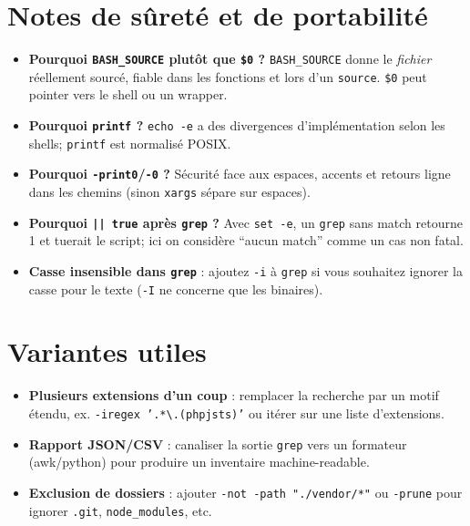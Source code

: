 \documentclass[11pt,a4paper]{article}
\begin{document}
\section{Notes de sûreté et de portabilité}
\begin{itemize}
  \item \textbf{Pourquoi \texttt{BASH\_SOURCE} plutôt que \texttt{\$0} ?} \texttt{BASH\_SOURCE} donne le \emph{fichier} réellement sourcé, fiable dans les fonctions et lors d'un \texttt{source}. \texttt{\$0} peut pointer vers le shell ou un wrapper.
  \item \textbf{Pourquoi \texttt{printf} ?} \texttt{echo -e} a des divergences d'implémentation selon les shells; \texttt{printf} est normalisé POSIX.
  \item \textbf{Pourquoi \texttt{-print0}/\texttt{-0} ?} Sécurité face aux espaces, accents et retours ligne dans les chemins (sinon \texttt{xargs} sépare sur espaces).
  \item \textbf{Pourquoi \texttt{|| true} après \texttt{grep} ?} Avec \texttt{set -e}, un \texttt{grep} sans match retourne 1 et tuerait le script; ici on considère ``aucun match'' comme un cas non fatal.
  \item \textbf{Casse insensible dans \texttt{grep}} : ajoutez \texttt{-i} à \texttt{grep} si vous souhaitez ignorer la casse pour le texte (\texttt{-I} ne concerne que les binaires).
\end{itemize}

\section{Variantes utiles}
\begin{itemize}
  \item \textbf{Plusieurs extensions d'un coup} : remplacer la recherche par un motif étendu, ex. \texttt{-iregex '.*\textbackslash.(php\textbar js\textbar ts)'} ou itérer sur une liste d'extensions.
  \item \textbf{Rapport JSON/CSV} : canaliser la sortie \texttt{grep} vers un formateur (awk/python) pour produire un inventaire machine-readable.
  \item \textbf{Exclusion de dossiers} : ajouter \texttt{-not -path "./vendor/*"} ou \texttt{-prune} pour ignorer \texttt{.git}, \texttt{node\_modules}, etc.
\end{itemize}
\end{document}
